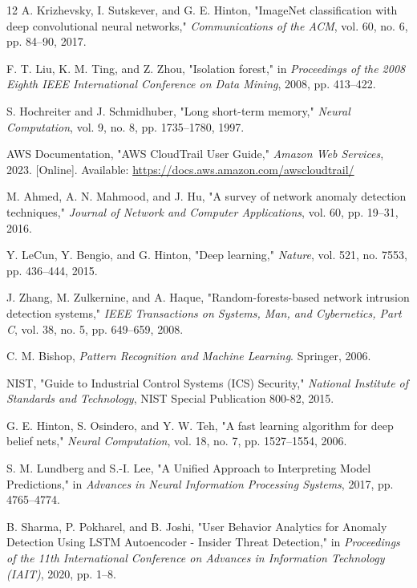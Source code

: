 \documentclass[conference]{IEEEtran}
\begin{document}
\begin{thebibliography}{12}
A. Krizhevsky, I. Sutskever, and G. E. Hinton, "ImageNet classification with deep convolutional neural networks," \emph{Communications of the ACM}, vol. 60, no. 6, pp. 84--90, 2017.

F. T. Liu, K. M. Ting, and Z. Zhou, "Isolation forest," in \emph{Proceedings of the 2008 Eighth IEEE International Conference on Data Mining}, 2008, pp. 413--422.

S. Hochreiter and J. Schmidhuber, "Long short-term memory," \emph{Neural Computation}, vol. 9, no. 8, pp. 1735--1780, 1997.

AWS Documentation, "AWS CloudTrail User Guide," \emph{Amazon Web Services}, 2023. [Online]. Available: \url{https://docs.aws.amazon.com/awscloudtrail/}

M. Ahmed, A. N. Mahmood, and J. Hu, "A survey of network anomaly detection techniques," \emph{Journal of Network and Computer Applications}, vol. 60, pp. 19--31, 2016.

Y. LeCun, Y. Bengio, and G. Hinton, "Deep learning," \emph{Nature}, vol. 521, no. 7553, pp. 436--444, 2015.

J. Zhang, M. Zulkernine, and A. Haque, "Random-forests-based network intrusion detection systems," \emph{IEEE Transactions on Systems, Man, and Cybernetics, Part C}, vol. 38, no. 5, pp. 649--659, 2008.

C. M. Bishop, \emph{Pattern Recognition and Machine Learning}. Springer, 2006.

NIST, "Guide to Industrial Control Systems (ICS) Security," \emph{National Institute of Standards and Technology}, NIST Special Publication 800-82, 2015.

G. E. Hinton, S. Osindero, and Y. W. Teh, "A fast learning algorithm for deep belief nets," \emph{Neural Computation}, vol. 18, no. 7, pp. 1527--1554, 2006.

S. M. Lundberg and S.-I. Lee, "A Unified Approach to Interpreting Model Predictions," in \emph{Advances in Neural Information Processing Systems}, 2017, pp. 4765--4774.

B. Sharma, P. Pokharel, and B. Joshi, "User Behavior Analytics for Anomaly Detection Using LSTM Autoencoder - Insider Threat Detection," in \emph{Proceedings of the 11th International Conference on Advances in Information Technology (IAIT)}, 2020, pp. 1--8.
\end{thebibliography}
\end{document}
